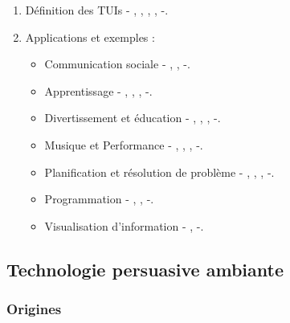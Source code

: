 \documentclass[10pt,a5paper,twoside]{article}
\begin{document}
\begin{enumerate}
\def\labelenumi{\arabic{enumi}.}
\item
  Définition des TUIs - \citet{wellner1993back},
  \citet{fitzmaurice1995bricks}, \citet{ishii1997tangible},
  \citet{ullmer2000emerging}, \citet{shaer2010tangible} -.
\item
  Applications et exemples :

  \begin{itemize}
  \itemsep1pt\parskip0pt
  \item
    Communication sociale - \citet{werner2008unitedpulse},
    \citet{ernevi2005interactive}, \citet{chang2001lumitouch} -.
  \item
    Apprentissage - \citet{zufferey2009tinkerSheets},
    \citet{underkoffler1998illuminatinglight}, \citet{raffle2004topobo},
    \citet{frei2000curlybot} -.
  \item
    Divertissement et éducation - \citet{zigelbaum2007tangible},
    \citet{ryokai2004iobrush}, \citet{frey2014teegi},
    \citet{gervais2015tobe} -.
  \item
    Musique et Performance - \citet{jorda2007reactable},
    \citet{schiettecatte2008audiocubes}, \citet{patten2002audiopad},
    \citet{newton2003block} -.
  \item
    Planification et résolution de problème - \citet{ishii2008tangible},
    \citet{underkoffler1999urp}, \citet{patten2007mechanical},
    \citet{jacob2002tangible} -.
  \item
    Programmation - \citet{suzuki1995interaction},
    \citet{horn2008tangible}, -.
  \item
    Visualisation d'information - \citet{couture2008geotui},
    \citet{hinckley1994passive} -.
  \end{itemize}
\end{enumerate}

\subsection{Technologie persuasive
ambiante}\label{technologie-persuasive-ambiante}

\subsubsection{Origines}\label{origines}
\end{document}
